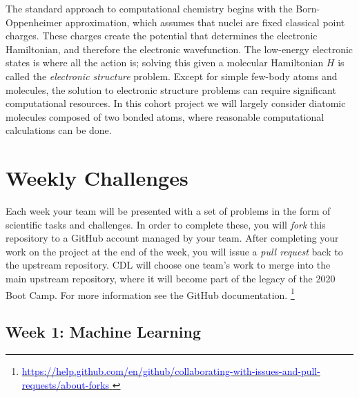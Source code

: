 \documentclass[12pt]{article}
\begin{document}
The standard approach to computational chemistry begins with the Born-Oppenheimer approximation, which assumes that nuclei are fixed classical point charges. These charges create the potential that determines the electronic Hamiltonian, and therefore the electronic wavefunction.
The low-energy electronic states is where all the action is; solving this given a molecular Hamiltonian $H$ is
called the {\it electronic structure} problem.
Except for simple few-body atoms and molecules, the solution to electronic structure problems can require significant computational resources.  In this cohort project we will largely consider diatomic molecules composed of two bonded atoms, where reasonable computational calculations can be done.

\newpage

\section{Weekly Challenges}

Each week your team will be presented with a set of problems in the form of scientific tasks and challenges.  In order to complete these, you will {\it fork} this repository to a GitHub account managed by your team.  After completing your work on the project at the end of the week, you will issue a {\it pull request} back to the upstream repository.
CDL will choose one team's work to merge into the main upstream repository, where it will become part of the legacy of the 2020 Boot Camp.  For more information see the
GitHub documentation.
\footnote{
    \href{https://help.github.com/en/github/collaborating-with-issues-and-pull-requests/about-forks}{\textcolor{blue}{https://help.github.com/en/github/collaborating-with-issues-and-pull-requests/about-forks} } }

\subsection{Week 1: Machine Learning}
\end{document}
